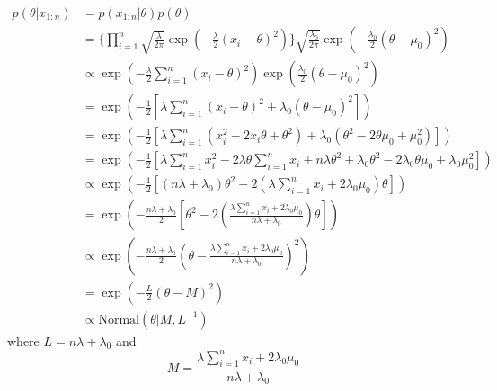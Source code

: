\documentclass{article}
\begin{document}
\begin{align*}
p(\theta|x_{1:n})&=p(x_{1:n}|\theta)p(\theta) \\
&=\Big\{\prod\limits_{i=1}^{n}\sqrt{\frac{\lambda}{2\pi}}\exp(-\frac{\lambda}{2}(x_i-\theta)^2)\Big\} \sqrt{\frac{\lambda_0}{2\pi}} \exp(-\frac{\lambda_0}{2}(\theta-\mu_0)^2) \\
&\propto \exp(-\frac{\lambda}{2}\sum\limits_{i=1}^{n}(x_i-\theta)^2)\exp(\frac{\lambda_0}{2}(\theta-\mu_0)^2) \\
&=\exp(-\frac{1}{2}[\lambda\sum\limits_{i=1}^{n}(x_i-\theta)^2+\lambda_0(\theta-\mu_0)^2])\\
&=\exp(-\frac{1}{2}[\lambda\sum\limits_{i=1}^{n}(x_i^2-2x_i\theta+\theta^2)+\lambda_0(\theta^2-2\theta\mu_0+\mu_0^2)])\\
&=\exp(-\frac{1}{2}[\lambda\sum\limits_{i=1}^{n}x_i^2-2\lambda\theta\sum\limits_{i=1}^{n}x_i+n\lambda\theta^2+\lambda_0\theta^2-2\lambda_0\theta\mu_0+\lambda_0\mu_0^2]) \\
&\propto \exp(-\frac{1}{2}[(n\lambda+\lambda_0)\theta^2-2(\lambda\sum\limits_{i=1}^{n}x_i+2\lambda_0\mu_0)\theta])\\
&=\exp(-\frac{n\lambda+\lambda_0}{2}[\theta^2-2(\frac{\lambda\sum\limits_{i=1}^{n}x_i+2\lambda_0\mu_0}{n\lambda+\lambda_0})\theta]) \\
& \propto \exp(-\frac{n\lambda+\lambda_0}{2}(\theta-\frac{\lambda\sum\limits_{i=1}^{n}x_i+2\lambda_0\mu_0}{n\lambda+\lambda_0})^2) \\
&=\exp(-\frac{L}{2}(\theta-M)^2) \\
&\propto \text{Normal}(\theta|M,L^{-1})
\end{align*}
where $L=n\lambda+\lambda_0$ and
$$M=\frac{\lambda\sum\limits_{i=1}^{n}x_i+2\lambda_0\mu_0}{n\lambda+\lambda_0}$$
\end{document}
